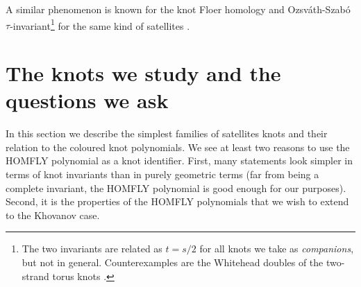 \documentclass[11pt]{article}
\begin{document}
A similar phenomenon is known for the knot Floer homology and Ozsv\'ath-Szab\'o $\tau$-invariant\footnote{The two invariants are related as $t=s/2$ for all knots we take as \textit{companions}, but not in general. Counterexamples are the Whitehead doubles of the two-strand torus knots \cite{HedOrd}.}  for the same kind of satellites 
\cite{HedWh, HedCab1,HedCab2}.  

%

\section{The knots we study and the questions we ask\label{sec:knoque}}
In this section we describe the simplest families of satellites knots and their relation to the coloured knot polynomials. We see at least two reasons to use the HOMFLY polynomial as a knot identifier. First, many statements look simpler in terms of knot invariants than in purely geometric terms (far from being a complete invariant, the HOMFLY polynomial is good enough for our purposes). Second, it is the properties of the HOMFLY polynomials that we wish to extend to the Khovanov case.
\end{document}
